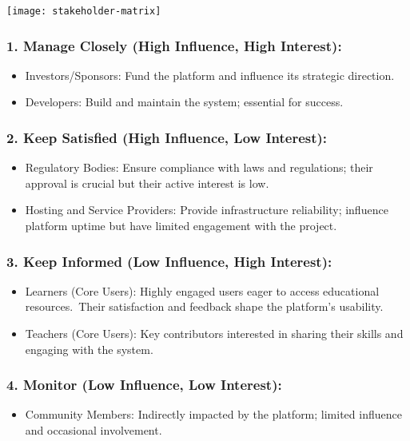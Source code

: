 \texttt{[image: stakeholder-matrix]}

\subsubsection*{1. Manage Closely (High Influence, High Interest):}
\begin{itemize}
\item Investors/Sponsors: Fund the platform and influence its strategic direction.
\item Developers: Build and maintain the system; essential for success.
\end{itemize}

\subsubsection*{2. Keep Satisfied (High Influence, Low Interest):}
\begin{itemize}
\item Regulatory Bodies: Ensure compliance with laws and regulations; their approval is crucial but their active interest is low.
\item Hosting and Service Providers: Provide infrastructure reliability; influence platform uptime but have limited engagement with the project.
\end{itemize}

\subsubsection*{3. Keep Informed (Low Influence, High Interest):}
\begin{itemize}
\item Learners (Core Users): Highly engaged users eager to access educational resources.\ Their satisfaction and feedback shape the platform’s usability.
\item Teachers (Core Users): Key contributors interested in sharing their skills and engaging with the system.
\end{itemize}

\subsubsection*{4. Monitor (Low Influence, Low Interest):}
\begin{itemize}
\item Community Members: Indirectly impacted by the platform; limited influence and occasional involvement.
\end{itemize}


